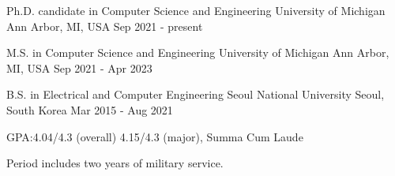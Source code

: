 

\begin{cventries}

  \cventry
    {Ph.D. candidate in Computer Science and Engineering}
    {University of Michigan} %
    {Ann Arbor, MI, USA} %
    {Sep 2021 - present} %
    {}

  \vspace{-5mm}

  \cventry
    {M.S. in Computer Science and Engineering}
    {University of Michigan} %
    {Ann Arbor, MI, USA} %
    {Sep 2021 - Apr 2023} %
    {}

  \vspace{-5mm}
    
  \cventry
    {B.S. in Electrical and Computer Engineering}
    {Seoul National University} %
    {Seoul, South Korea} %
    {Mar 2015 - Aug 2021} %
    {
      \begin{cvitems} %
        \item {GPA:\@ 4.04/4.3 (overall) 4.15/4.3 (major), Summa Cum Laude}
        \item {Period includes two years of military service.}
      \end{cvitems}
    }
    
\end{cventries}
